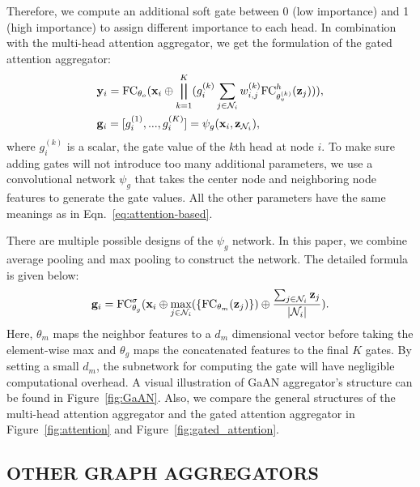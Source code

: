 \documentclass{article}
\DeclarePairedDelimiter\abs{\lvert}{\rvert}\DeclarePairedDelimiter\norm{\lVert}{\rVert}
\begin{document}
Therefore, we compute an additional soft gate between 0 (low importance) and 1 (high importance) to assign different importance to each head. In combination with the multi-head attention aggregator, we get the formulation of the gated attention aggregator:
	\begin{equation}
	\begin{aligned}
	&\mathbf{y}_i = \text{FC}_{\theta_o}(\mathbf{x}_i \oplus \bigparallel_{k=1}^K (g_i^{(k)} \sum_{j\in \mathcal{N}_i}w^{(k)}_{i, j}\text{FC}^h_{\theta_{v}^{(k)}}(\mathbf{z}_j))),\\
	&\mathbf{g}_i = [g_i^{(1)},..., g_i^{(K)}] = \psi_{g}(\mathbf{x}_i, \mathbf{z}_{\mathcal{N}_i}),
	\end{aligned}
	\end{equation}
	where $g_i^{(k)}$ is a scalar, the gate value of the $k$th head at node $i$. To make sure adding gates will not introduce too many additional parameters, we use a convolutional network $\psi_{g}$ that takes the center node and neighboring node features to generate the gate values. All the other parameters have the same meanings as in Eqn.~\eqref{eq:attention-based}.
	
	There are multiple possible designs of the $\psi_g$ network. In this paper, we combine average pooling and max pooling to construct the network. The detailed formula is given below:
	\vskip -0.1in
	\begin{equation}
	\begin{aligned}
	& \mathbf{g}_i = \text{FC}_{\theta_{g}}^\sigma( \mathbf{x}_i \oplus \max_{j\in\mathcal{N}_i}(\{\text{FC}_{\theta_{m}}(\mathbf{z}_j)\}) \oplus \frac{\sum_{j \in \mathcal{N}_i} \mathbf{z}_j}{\abs{\mathcal{N}_i}}).\\
	\end{aligned}
	\end{equation}
	\vskip -0.1in
	Here, $\theta_{m}$ maps the neighbor features to a $d_m$ dimensional vector before taking the element-wise max and $\theta_{g}$ maps the concatenated features to the final $K$ gates. By setting a small $d_m$, the subnetwork for computing the gate will have negligible computational overhead. A visual illustration of GaAN aggregator's structure can be found in Figure~\ref{fig:GaAN}. Also, we compare the general structures of the multi-head attention aggregator and the gated attention aggregator in Figure~\ref{fig:attention} and Figure~\ref{fig:gated_attention}.
	

	\subsection{OTHER GRAPH AGGREGATORS}
	\label{sec:existing_aggregator}
	
\end{document}
